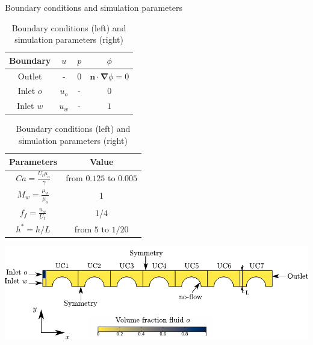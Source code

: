 \documentclass[presentation]{beamer}
\begin{document}
\begin{frame}[label={sec:org630fdfe}]{Boundary conditions and simulation parameters}
\begin{table}
\centering{}
\begin{tabular}{cccc}
\toprule 
Boundary & $u$ & $p$ & $\ensuremath{\phi}$\tabularnewline
\midrule
\midrule 
Outlet & - & $0$ & $\mathbf{n}\cdot\boldsymbol{\nabla}\phi=0$\tabularnewline

Inlet $o$ & $u_{o}$ & - & $0$\tabularnewline

Inlet $w$ & $u_{w}$ & - & $1$\tabularnewline
\bottomrule
\end{tabular}\hfill{}%
\begin{tabular}{cc}
\toprule 
Parameters & Value\tabularnewline
\midrule
\midrule 
$Ca=\frac{U_{t}\mu_{o}}{\gamma}$ & from $0.125$ to $0.005$\tabularnewline

$M_{w}=\frac{\mu_{w}}{\mu_{o}}$ & 1\tabularnewline

$f_{f}=\frac{u_{w}}{U_{t}}$ & 1/4\tabularnewline

$h^{*}=h/L$ & from $5$ to $1/20$\tabularnewline
\bottomrule
\end{tabular}
\caption{Boundary conditions (left) and simulation parameters (right)}
\end{table}

\centering
\includegraphics[scale=0.7]{DNS_model.pdf}
\end{frame}
\end{document}
